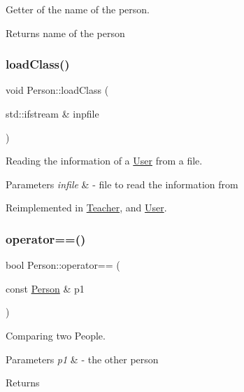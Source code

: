 Getter of the name of the person. 

\begin{DoxyReturn}{Returns}
name of the person 
\end{DoxyReturn}
\mbox{\label{class_person_af07a032df8d56dddade4dc43960b536b}} 
\subsubsection{\texorpdfstring{load\+Class()}{loadClass()}}
{\footnotesize\ttfamily void Person\+::load\+Class (\begin{DoxyParamCaption}\item[{std\+::ifstream \&}]{inpfile }\end{DoxyParamCaption})\hspace{0.3cm}{\ttfamily [virtual]}}



Reading the information of a \mbox{\hyperlink{class_user}{User}} from a file. 


\begin{DoxyParams}{Parameters}
{\em infile} & -\/ file to read the information from \\
\hline
\end{DoxyParams}


Reimplemented in \mbox{\hyperlink{class_teacher_a1f204644af41c43ff3bd0582393062fa}{Teacher}}, and \mbox{\hyperlink{class_user_abc12a9ca668bd860a3d6d2ae4791997d}{User}}.

\mbox{\label{class_person_aa2fe338cbcf08ee5981dce811fd3a50a}} 
\subsubsection{\texorpdfstring{operator==()}{operator==()}}
{\footnotesize\ttfamily bool Person\+::operator== (\begin{DoxyParamCaption}\item[{const \mbox{\hyperlink{class_person}{Person}} \&}]{p1 }\end{DoxyParamCaption})}



Comparing two People. 


\begin{DoxyParams}{Parameters}
{\em p1} & -\/ the other person \\
\hline
\end{DoxyParams}
\begin{DoxyReturn}{Returns}

\end{DoxyReturn}
\mbox{\label{class_person_a80f87df3f644706c2ad8fc8b800fdd95}} 
